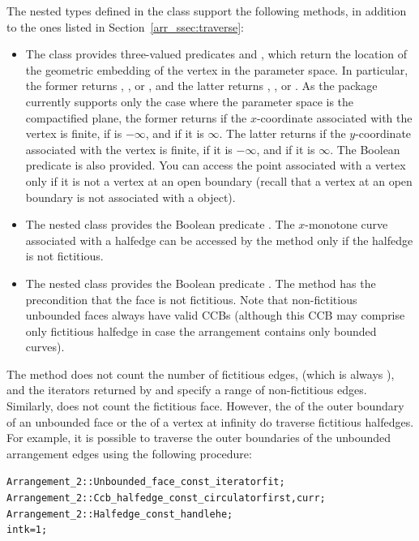 \begin{ccAdvanced}
The nested types defined in the  class support the
following methods, in addition to the ones listed in
Section~\ref{arr_ssec:traverse}:
\begin{itemize}
\item
 The  class provides three-valued predicates
   and , which
  return the location of the geometric embedding of the vertex in the
  parameter space. In particular, the former returns
  , , or
  , and the latter returns
  , , or
  . As the package currently supports only the
  case where the parameter space is the compactified plane, the former
  returns  if the $x$-coordinate associated with the
  vertex is finite,  if is $-\infty$, and
   if it is $\infty$. The latter returns
   if the $y$-coordinate associated with the vertex
  is finite,  if it is $-\infty$, and
   if it is $\infty$. The Boolean predicate
   is also provided. You can access the
  point associated with a vertex only if it is not a vertex at an open
  boundary (recall that a vertex at an open boundary is not associated
  with a  object).
%
\item
  The nested  class provides the Boolean predicate
  . The $x$-monotone curve associated with
  a halfedge can be accessed by the  method only if the
  halfedge is not fictitious.
%
\item
  The nested  class provides the Boolean predicate
  . The method  has the
  precondition that the face is not fictitious. Note that non-fictitious
  unbounded faces always have valid CCBs (although this CCB may
  comprise only fictitious halfedge in case the arrangement contains
  only bounded curves).
\end{itemize}

The method  does not count the number of
fictitious edges, (which is always
), and the iterators
returned by  and  specify
a range of non-fictitious edges. Similarly, 
does not count the fictitious face. However, the
 of the outer boundary of an
unbounded face or the  of a vertex
at infinity do traverse fictitious halfedges. For example, it is possible
to traverse the outer boundaries of the unbounded arrangement edges
using the following procedure:
\begin{alltt}
  Arrangement_2::Unbounded_face_const_iterator  fit;
  Arrangement_2::Ccb_halfedge_const_circulator  first, curr;
  Arrangement_2::Halfedge_const_handle          he;
  int                                           k = 1;


\end{alltt}
\end{ccAdvanced}

